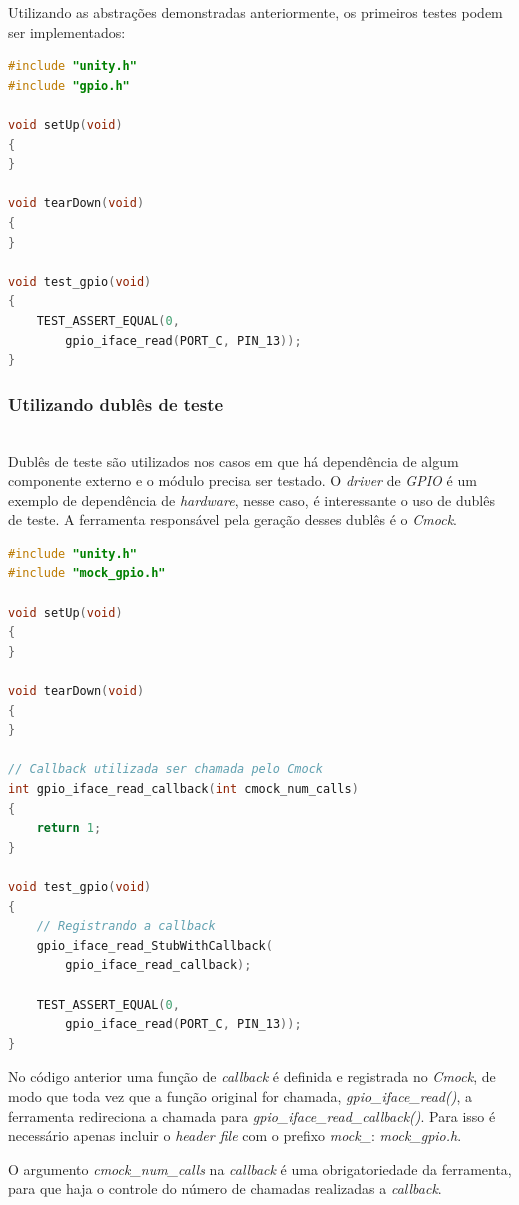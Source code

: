 \documentclass[times, twoside, watermark]{artigo}
\begin{document}
Utilizando as abstrações demonstradas anteriormente, os primeiros testes podem ser 
implementados:

\begin{lstlisting}[language=C, caption=Arquivo de testes com um teste simples]
#include "unity.h"
#include "gpio.h"

void setUp(void)
{
}

void tearDown(void)
{
}

void test_gpio(void)
{
    TEST_ASSERT_EQUAL(0, 
        gpio_iface_read(PORT_C, PIN_13));
}
\end{lstlisting}

\subsubsection{Utilizando dublês de teste}\hfill\\

Dublês de teste são utilizados nos casos em que há dependência de algum componente 
externo e o módulo precisa ser testado. O \textit{driver} de \textit{GPIO} é um 
exemplo de dependência de \textit{hardware}, nesse caso, é interessante o uso 
de dublês de teste. A ferramenta responsável pela geração desses dublês é o 
\textit{Cmock}.

\begin{lstlisting}[language=C, caption=Arquivo de testes com mock]
#include "unity.h"
#include "mock_gpio.h"

void setUp(void)
{
}

void tearDown(void)
{
}

// Callback utilizada ser chamada pelo Cmock
int gpio_iface_read_callback(int cmock_num_calls)
{
    return 1;
}

void test_gpio(void)
{
    // Registrando a callback
    gpio_iface_read_StubWithCallback(
        gpio_iface_read_callback);
        
    TEST_ASSERT_EQUAL(0, 
        gpio_iface_read(PORT_C, PIN_13));
}
\end{lstlisting}


No código anterior uma função de \textit{callback} é definida e registrada no 
\textit{Cmock}, de modo que toda vez que a função original for chamada,
\textit{gpio\_iface\_read()}, a ferramenta redireciona a chamada para 
\textit{gpio\_iface\_read\_callback()}. Para isso é necessário apenas incluir 
o \textit{header file} com o prefixo \textit{mock\_}: \textit{mock\_gpio.h}.

O argumento \textit{cmock\_num\_calls} na \textit{callback} é uma obrigatoriedade
da ferramenta, para que haja o controle do número de chamadas realizadas a 
\textit{callback}.
\end{document}
